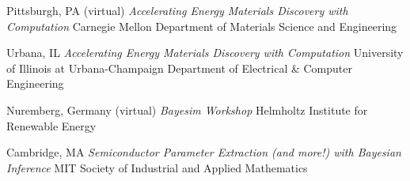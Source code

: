 \vspace{-2mm}
\datedsubsection{}
    {Pittsburgh, PA (virtual)}
    {\textit{Accelerating Energy Materials Discovery with Computation}}
    {Carnegie Mellon Department of Materials Science and Engineering}

\vspace{-2mm}
\datedsubsection{}
    {Urbana, IL}
    {\textit{Accelerating Energy Materials Discovery with Computation}}
    {University of Illinois at Urbana-Champaign Department of Electrical \& Computer Engineering}

\vspace{-2mm}
    {Nuremberg, Germany (virtual)}
    {\textit{Bayesim Workshop}}
    {Helmholtz Institute for Renewable Energy}

\vspace{-2mm}
    {Cambridge, MA}
    {\textit{Semiconductor Parameter Extraction (and more!) with Bayesian Inference}}
    {MIT Society of Industrial and Applied Mathematics}